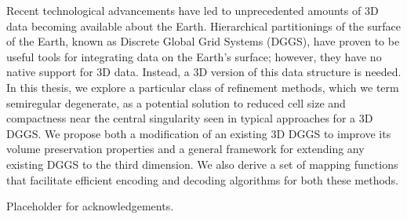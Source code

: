 %
\newpage
{}
{}
Recent technological advancements have led to unprecedented amounts of 3D data becoming available about the Earth.
Hierarchical partitionings of the surface of the Earth, known as Discrete Global Grid Systems (DGGS), have proven to be useful tools for integrating data on the Earth's surface; however, they have no native support for 3D data. Instead, a 3D version of this data structure is needed. In this thesis, we explore a particular class of refinement methods, which we term semiregular degenerate, as a potential solution to reduced cell size and compactness near the central singularity seen in typical approaches for a 3D DGGS.
We propose both a modification of an existing 3D DGGS to improve its volume preservation properties and a general framework for extending any existing DGGS to the third dimension. We also derive a set of mapping functions that facilitate efficient encoding and decoding algorithms for both these methods.

\newpage
{}
{}
Placeholder for acknowledgements.

\begin{singlespace}
\newpage
{}
\tableofcontents
\pagestyle{plain}
\newpage
{}
\listoftables
\pagestyle{plain}
\newpage
{}
\listoffigures
\pagestyle{plain}
\clearpage
\clearpage          %
\end{singlespace}
